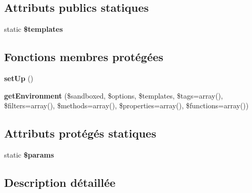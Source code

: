 \subsection*{Attributs publics statiques}
\begin{DoxyCompactItemize}
\item 
static {\bfseries \$templates}\hypertarget{class_twig___tests___extension___sandbox_test_a3326a7f5703016042df69801c9770b4c}{}\label{class_twig___tests___extension___sandbox_test_a3326a7f5703016042df69801c9770b4c}

\end{DoxyCompactItemize}
\subsection*{Fonctions membres protégées}
\begin{DoxyCompactItemize}
\item 
{\bfseries set\+Up} ()\hypertarget{class_twig___tests___extension___sandbox_test_a0bc688732d2b3b162ffebaf7812e78da}{}\label{class_twig___tests___extension___sandbox_test_a0bc688732d2b3b162ffebaf7812e78da}

\item 
{\bfseries get\+Environment} (\$sandboxed, \$options, \$templates, \$tags=array(), \$filters=array(), \$methods=array(), \$properties=array(), \$functions=array())\hypertarget{class_twig___tests___extension___sandbox_test_ab26b92f6a9d99dcb70f17a2b74463893}{}\label{class_twig___tests___extension___sandbox_test_ab26b92f6a9d99dcb70f17a2b74463893}

\end{DoxyCompactItemize}
\subsection*{Attributs protégés statiques}
\begin{DoxyCompactItemize}
\item 
static {\bfseries \$params}\hypertarget{class_twig___tests___extension___sandbox_test_afe68e6fbe7acfbffc0af0c84a1996466}{}\label{class_twig___tests___extension___sandbox_test_afe68e6fbe7acfbffc0af0c84a1996466}

\end{DoxyCompactItemize}


\subsection{Description détaillée}


